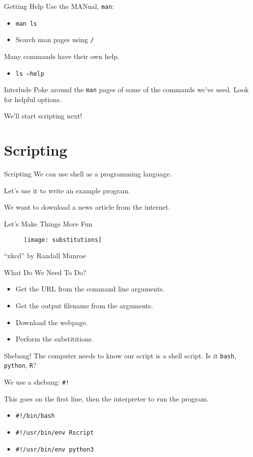 \documentclass[pdf,usenames,dvipsnames,14pt]{beamer}%
\begin{document}
\begin{frame}{Getting Help}
	Use the MANual, \texttt{man}:
	\begin{itemize}
		\item \texttt{man ls}
		\item Search man pages using \texttt{/}
	\end{itemize}
	Many commands have their own help.
	\begin{itemize}
		\item \texttt{ls --help}
	\end{itemize}
\end{frame}

\begin{frame}{Interlude}
	Poke around the \texttt{man} pages of some of the commands we've used. Look for helpful options.
	
	We'll start scripting next!
\end{frame}

\section{Scripting}

\begin{frame}{Scripting}
	We can use shell as a programming language.
	
	Let's use it to write an example program.
	
	We want to download a news article from the internet.
\end{frame}

\begin{frame}{Let's Make Things More Fun}
	\begin{figure}
		\texttt{[image: substitutions]}
	\end{figure}
	``xkcd'' by Randall Munroe
\end{frame}

\begin{frame}{What Do We Need To Do?}
	\begin{itemize}
		\item Get the URL from the command line arguments.
		\item Get the output filename from the arguments.
		\item Download the webpage.
		\item Perform the substititions.
	\end{itemize}
\end{frame}

\begin{frame}{Shebang!}
	The computer needs to know our script is a shell script.
	Is it \texttt{bash}, \texttt{python}, \texttt{R}?
	
	We use a shebang: \texttt{\#!}
	
	This goes on the first line, then the interpreter to run the program.
	\begin{itemize}
		\item \texttt{\#!/bin/bash}
		\item \texttt{\#!/usr/bin/env Rscript}
		\item \texttt{\#!/usr/bin/env python3}
	\end{itemize}
\end{frame}
\end{document}
